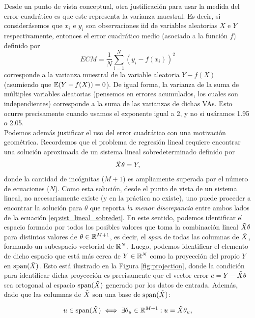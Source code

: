 Desde un punto de vista conceptual, otra justificación para usar la medida del  error cuadrático es que este representa la varianza muestral. Es decir, si considerásemos que $x_i$ e $y_i$ son observaciones iid de variables aleatorias $X$ e $Y$ respectivamente, entonces el error cuadrático medio (asociado a la función $f$) definido por
\begin{equation}
	ECM = \frac{1}{N}\sum_{i=1}^N (y_i-f(x_i))^2
\end{equation}
corresponde a la varianza muestral de la variable aleatoria $Y-f(X)$ (asumiendo que $\operatorname{\mathbb{E}}(Y-f(X))=0$). De igual forma, la varianza de la suma de múltiples variables aleatorias (pensemos en errores acumulados, los cuales son independientes) corresponde a la suma de las varianzas de dichas VAs. Esto ocurre precisamente cuando usamos el exponente igual a 2, y no si usáramos 1.95 o 2.05.\\

Podemos además justificar el uso del error cuadrático con una motivación geométrica. Recordemos que el problema de regresión lineal requiere encontrar una solución aproximada de un sistema lineal sobredeterminado definido por 
\begin{equation}
	\tilde{X} \theta = Y,\label{eq:sist_lineal_sobredet}
\end{equation}
donde la cantidad de incógnitas ($M+1$) es ampliamente superada por el número de ecuaciones ($N$). Como esta solución, desde el punto de vista de un sistema lineal, no necesariamente existe (y en la práctica no existe), uno puede proceder a encontrar la solución para $\theta$ que reporta \emph{la menor discrepancia} entre ambos lados de la ecuación \eqref{eq:sist_lineal_sobredet}. En este sentido, podemos identificar el espacio formado por todos los posibles valores que toma la combinación lineal $\tilde{X} \theta$ para distintos valores de $\theta\in\mathbb{R}^{M+1}$, es decir, el \emph{span} de todas las columnas de $\tilde{X}$, formando un subespacio vectorial de $\mathbb{R}^N$. Luego, podemos identificar el elemento de dicho espacio que está más cerca de $Y\in\mathbb{R}^N$  como la proyección del propio $Y$ en $\text{span}(\tilde{X})$. Esto está ilustrado en la Figura \ref{fig:projection}, donde la condición para identificar dicha proyección es  precisamente que el vector error $e=Y-\tilde{X} \theta$ sea ortogonal al espacio  $\text{span}(\tilde{X})$ generado por los datos de entrada. Además, dado que las columnas de $\tilde{X}$ son una base de $\text{span}(\tilde{X})$:

\begin{equation}
	u\in \text{span}(\tilde{X}) \iff \exists \theta_u\in \mathbb{R}^{M+1}: u=\tilde{X}\theta_u,
\end{equation}

